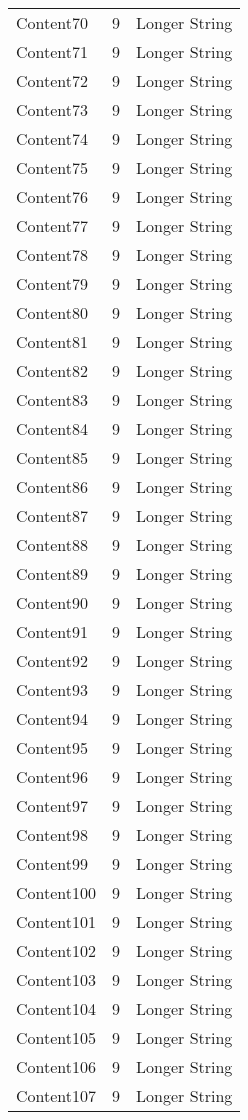 \documentclass{article}%
\begin{document}
\begin{longtable}{l l l}
Content70&9&Longer String\\%
Content71&9&Longer String\\%
Content72&9&Longer String\\%
Content73&9&Longer String\\%
Content74&9&Longer String\\%
Content75&9&Longer String\\%
Content76&9&Longer String\\%
Content77&9&Longer String\\%
Content78&9&Longer String\\%
Content79&9&Longer String\\%
Content80&9&Longer String\\%
Content81&9&Longer String\\%
Content82&9&Longer String\\%
Content83&9&Longer String\\%
Content84&9&Longer String\\%
Content85&9&Longer String\\%
Content86&9&Longer String\\%
Content87&9&Longer String\\%
Content88&9&Longer String\\%
Content89&9&Longer String\\%
Content90&9&Longer String\\%
Content91&9&Longer String\\%
Content92&9&Longer String\\%
Content93&9&Longer String\\%
Content94&9&Longer String\\%
Content95&9&Longer String\\%
Content96&9&Longer String\\%
Content97&9&Longer String\\%
Content98&9&Longer String\\%
Content99&9&Longer String\\%
Content100&9&Longer String\\%
Content101&9&Longer String\\%
Content102&9&Longer String\\%
Content103&9&Longer String\\%
Content104&9&Longer String\\%
Content105&9&Longer String\\%
Content106&9&Longer String\\%
Content107&9&Longer String\\%

\end{longtable}
\end{document}
